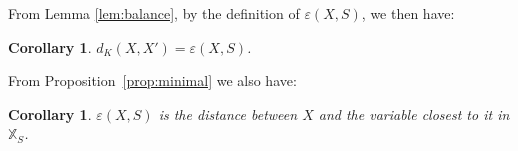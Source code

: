 \documentclass{article}
\newtheorem{corollary}[thm]{Corollary}
\DeclareMathOperator{\support}{support}
\begin{document}
	From Lemma \ref{lem:balance}, by the definition of $\varepsilon(X,S)$, we then have:
	\begin{corollary} \label{col:Xprime}
		$d_K(X,X') = \varepsilon(X,S)$.
	\end{corollary}
	From Proposition~\ref{prop:minimal} we also have:
	\begin{corollary} \label{col:Xprimeopt}
		$\varepsilon(X,S)$ is the distance between $X$ and the variable closest to it in $\mathbb{X}_S$.
	\end{corollary}
	
	
	
	
\end{document}
